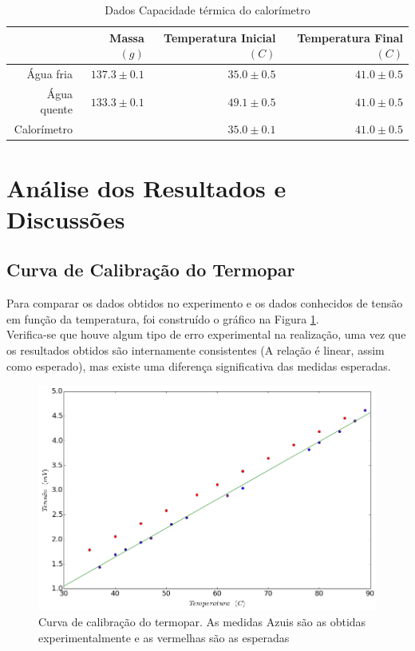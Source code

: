 \documentclass[12pt,a4paper]{article}
\begin{document}
\begin{table}[!htbp]

\centering
\def\arraystretch{1.5}
\caption{Dados Capacidade térmica do calorímetro}

\begin{tabular}{|r|r|r|r|}
\hline
&Massa $(g)$ & Temperatura Inicial $(C)$ & Temperatura Final $(C)$  \\
\hline
  Água fria & $137.3 \pm 0.1 $ & $35.0 \pm 0.5$ & $41.0 \pm 0.5$  \\
  \hline    
  Água quente & $133.3 \pm 0.1$ & $49.1 \pm 0.5$ & $41.0 \pm 0.5$ \\
  \hline
  Calorímetro &  & $35.0 \pm 0.1$ & $41.0 \pm 0.5$ \\
 
\hline
\end{tabular}


\label{dadoscalorimetro}
\end{table}


\section{Análise dos Resultados e Discussões}

\subsection{Curva de Calibração do Termopar}
Para comparar os dados obtidos no experimento e os dados conhecidos de tensão em função da temperatura, foi construído o gráfico na Figura \ref{termopar}.  \\
Verifica-se que houve algum tipo de erro experimental na realização, uma vez que os resultados obtidos são internamente consistentes (A relação é linear, assim como esperado), mas existe uma diferença significativa das medidas esperadas.

 
\begin{figure}[!htbp]
\includegraphics[scale=0.55]{termopar.png}
\caption{Curva de calibração do termopar. As medidas Azuis são as obtidas experimentalmente e as vermelhas são as esperadas}
\label{termopar}
\end{figure}
\end{document}
